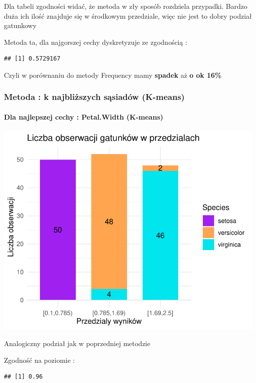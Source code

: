 \documentclass[
  12pt,
]{article}
\begin{document}
Dla tabeli zgodności widać, że metoda w zły sposób rozdziela przypadki.
Bardzo duża ich ilość znajduje się w środkowym przedziale, więc nie jest
to dobry podział gatunkowy

Metoda ta, dla najgorszej cechy dyskretyzuje ze zgodnością :

\begin{verbatim}
## [1] 0.5729167
\end{verbatim}

Czyli w porównaniu do metody Frequency mamy \textbf{spadek} aż \textbf{o
ok 16\%}

\subsubsection{Metoda : k najbliższych sąsiadów
(K-means)}\label{metoda-k-najbliux17cszych-sux105siaduxf3w-k-means}

\paragraph{Dla najlepszej cechy : Petal.Width
(K-means)}\label{dla-najlepszej-cechy-petal.width-k-means}

\begin{center}\includegraphics{Sprawozdanie2_files/figure-latex/tabela_kondygnacji_3_najl-1} \end{center}

Analogiczny podział jak w poprzedniej metodzie

Zgodność na poziomie :

\begin{verbatim}
## [1] 0.96
\end{verbatim}
\end{document}
